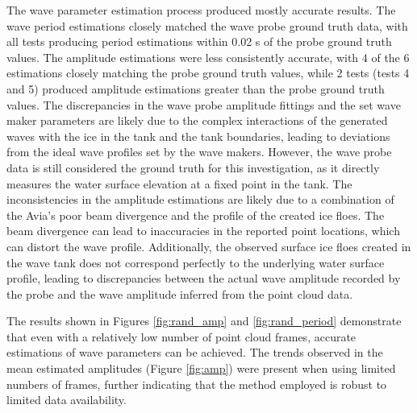 The wave parameter estimation process produced mostly accurate results. The wave period estimations closely matched the wave probe ground truth data, with all tests producing period estimations within 0.02 s of the probe ground truth values. The amplitude estimations were less consistently accurate, with 4 of the 6 estimations closely matching the probe ground truth values, while 2 tests (tests 4 and 5) produced amplitude estimations greater than the probe ground truth values. The discrepancies in the wave probe amplitude fittings and the set wave maker parameters are likely due to the complex interactions of the generated waves with the ice in the tank and the tank boundaries, leading to deviations from the ideal wave profiles set by the wave makers. However, the wave probe data is still considered the ground truth for this investigation, as it directly measures the water surface elevation at a fixed point in the tank. The inconsistencies in the amplitude estimations are likely due to a combination of the Avia's poor beam divergence and the profile of the created ice floes. The beam divergence can lead to inaccuracies in the reported point locations, which can distort the wave profile. Additionally, the observed surface ice floes created in the wave tank does not correspond perfectly to the underlying water surface profile, leading to discrepancies between the actual wave amplitude recorded by the probe and the wave amplitude inferred from the point cloud data.

The results shown in Figures \ref{fig:rand_amp} and \ref{fig:rand_period} demonstrate that even with a relatively low number of point cloud frames, accurate estimations of wave parameters can be achieved. The trends observed in the mean estimated amplitudes (Figure \ref{fig:amp}) were present when using limited numbers of frames, further indicating that the method employed is robust to limited data availability.

